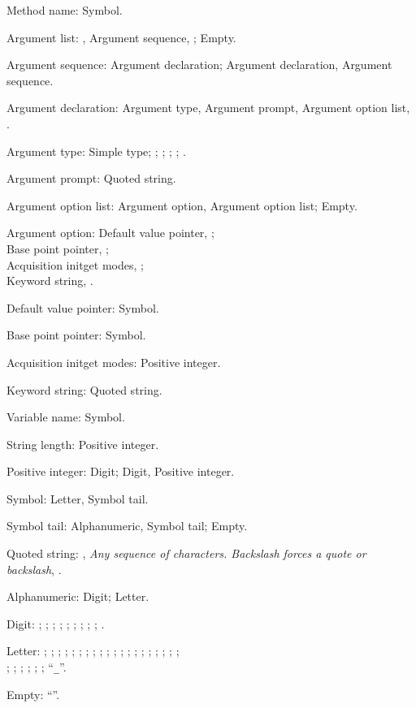 \documentclass{article}
\begin{document}
\begin{raggedright}
Method name: Symbol.

Argument list: \sy{((}, Argument sequence, \sy{))}; Empty.

Argument sequence: Argument declaration; Argument declaration,
                   Argument sequence.

Argument declaration: Argument type, Argument prompt, Argument option
                      list, .

Argument type: Simple type; ; ; ;
               ; .

Argument prompt: Quoted string.

Argument option list: Argument option, Argument option list; Empty.

Argument option: Default value pointer, ;\\
\tc              Base point pointer, ;\\
\tc              Acquisition initget modes, ;\\
\tc              Keyword string, .

Default value pointer: Symbol.

Base point pointer: Symbol.

Acquisition initget modes: Positive integer.

Keyword string: Quoted string.

\begin{center}
\end{center}
Variable name:  Symbol.

String length:  Positive integer.

Positive integer: Digit; Digit, Positive integer.

Symbol: Letter, Symbol tail.

Symbol tail: Alphanumeric, Symbol tail; Empty.

Quoted string: ,
     {\em Any sequence of characters.
    Backslash forces a quote or backslash}, .

Alphanumeric: Digit; Letter.

Digit: ; ; ; ; ; ; ; ;
       ; .

Letter: ; ; ; ; ; ; ;
        ; ; ; ; ; ; ;
        ; ; ; ; ; ;\\
\tc     {};
        ; ; ; ; ; ``\verb+_+''.

Empty: ``''.
\end{raggedright}
\end{document}
